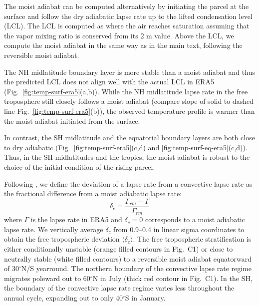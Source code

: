 \documentclass{ametsocV5}
\begin{document}
\appendix[B]
    
\appendix[C]
  The moist adiabat can be computed alternatively by initiating the parcel at the surface and follow the dry adiabatic lapse rate up to the lifted condensation level (LCL). The LCL is computed as where the air reaches saturation assuming that the vapor mixing ratio is conserved from its 2 m value. Above the LCL, we compute the moist adiabat in the same way as in the main text, following the reversible moist adiabat.

  The NH midlatitude boundary layer is more stable than a moist adiabat and thus the predicted LCL does not align well with the actual LCL in ERA5 (Fig.~\ref{fig:temp-surf-era5}(a,b)). While the NH midlatitude lapse rate in the free troposphere still closely follows a moist adiabat (compare slope of solid to dashed line Fig.~\ref{fig:temp-surf-era5}(b)), the observed temperature profile is warmer than the moist adiabat initiated from the surface.

  In contrast, the SH midlatitude and the equatorial boundary layers are both close to dry adiabatic (Fig.~\ref{fig:temp-surf-era5}(c,d) and \ref{fig:temp-surf-eq-era5}(c,d)). Thus, in the SH midlatitudes and the tropics, the moist adiabat is robust to the choice of the initial condition of the rising parcel.

\appendix[D]
  Following \cite{stone1979}, we define the deviation of a lapse rate from a convective lapse rate as the fractional difference from a moist adiabatic lapse rate:
    \begin{equation}
      \delta_{c} = \frac{\Gamma_{rm}-\Gamma}{\Gamma_{rm}}
    \end{equation}
  where $\Gamma$ is the lapse rate in ERA5 and $\delta_c=0$ corresponds to a moist adiabatic lapse rate. We vertically average \(\delta_{c}\) from 0.9--0.4 in linear sigma coordinates to obtain the free tropospheric deviation \(\langle \delta_{c} \rangle\). The free tropospheric stratification is either conditionally unstable (orange filled contours in Fig.~C1) or close to neutrally stable (white filled contours) to a reversible moist adiabat equatorward of 30$^{\circ}$N/S yearround. The northern boundary of the convective lapse rate regime migrates poleward out to 60$^{\circ}$N in July (thick red contour in Fig.~C1). In the SH, the boundary of the convective lapse rate regime varies less throughout the annual cycle, expanding out to only 40$^{\circ}$S in January.
\end{document}

